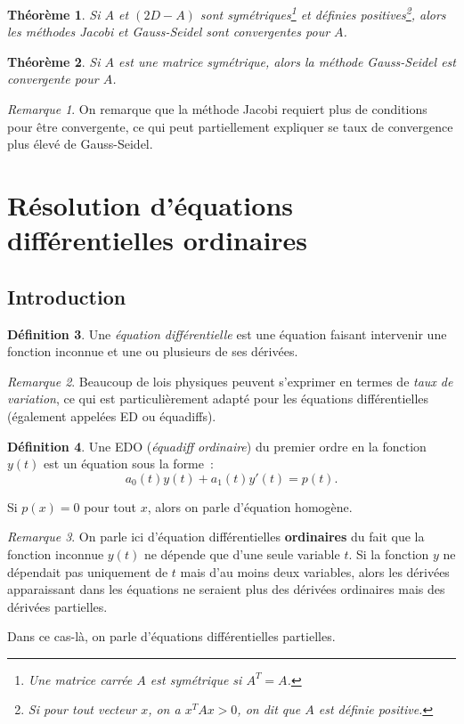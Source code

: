 \documentclass{article}
\newtheorem{thm}{Théorème}[section]
\theoremstyle{definition}
\newtheorem{déf}[thm]{Définition}
\theoremstyle{remark}
\newtheorem*{rmq}{Remarque}
\begin{document}
		\begin{thm} Si $A$ et $(2D-A)$ sont symétriques\footnote{Une matrice carrée $A$ est symétrique si $A^T = A$.} et définies positives\footnote{Si pour tout
		vecteur $x$, on a $x^TAx > 0$, on dit que $A$ est définie positive.}, alors les méthodes Jacobi et Gauss-Seidel sont convergentes pour $A$.
		\end{thm}

		\begin{thm} Si $A$ est une matrice symétrique, alors la méthode Gauss-Seidel est convergente pour $A$. \end{thm}

		\begin{rmq} On remarque que la méthode Jacobi requiert plus de conditions pour être convergente, ce qui peut partiellement expliquer se taux de
		convergence plus élevé de Gauss-Seidel.
		\end{rmq}

\newpage
\section{Résolution d'équations différentielles ordinaires}
	\subsection{Introduction}
		\begin{déf} Une \emph{équation différentielle} est une équation faisant intervenir une fonction inconnue et une ou plusieurs de ses dérivées. \end{déf}

		\begin{rmq} Beaucoup de lois physiques peuvent s'exprimer en termes de \emph{taux de variation}, ce qui est particulièrement adapté pour les équations
		différentielles (également appelées ED ou équadiffs).
		\end{rmq}

		\begin{déf} Une EDO (\emph{équadiff ordinaire}) du premier ordre en la fonction $y(t)$ est un équation sous la forme~:
		\[a_0(t)y(t) + a_1(t)y'(t) = p(t).\]

		Si $p(x) = 0$ pour tout $x$, alors on parle d'équation homogène.
		\end{déf}

		\begin{rmq} On parle ici d'équation différentielles \textbf{ordinaires} du fait que la fonction inconnue $y(t)$ ne dépende que d'une seule variable $t$.
		Si la fonction $y$ ne dépendait pas uniquement de $t$ mais d'au moins deux variables, alors les dérivées apparaissant dans les équations ne seraient
		plus des dérivées ordinaires mais des dérivées partielles.

		Dans ce cas-là, on parle d'équations différentielles partielles.
		\end{rmq}
\end{document}

